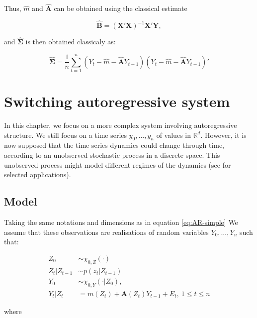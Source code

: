 \documentclass[]{book}
\begin{document}
Thus, \(\hat{m}\) and \(\hat{\mathbf{A}}\) can be obtained using the
classical estimate

\begin{equation}
\hat{\mathbf{B}} = \left(\mathbf{X'X}\right)^{-1}\mathbf{X}'\mathbf{Y}, \label{eq:AR-simple-B-hat}
\end{equation}

and \(\hat{\mathbf{\Sigma}}\) is then obtained classicaly as:

\begin{equation}
\hat{\mathbf{\Sigma}} = \frac{1}{n} \sum_{t = 1}^n \left(Y_t - \hat{m} - \hat{\mathbf{A}} Y_{t - 1}\right) \left(Y_t - \hat{m} - \hat{\mathbf{A}} Y_{t - 1}\right)' \label{eq:AR-simple-Sigma-hat}
\end{equation}

\chapter{Switching autoregressive
system}\label{switching-autoregressive-system}

In this chapter, we focus on a more complex system involving
autoregressive structure. We still focus on a time series
\(y_0, \dots, y_n\) of values in \(\mathbb{R}^d\). However, it is now
supposed that the time series dynamics could change through time,
according to an unobserved stochastic process in a discrete space. This
unobserved process might model different regimes of the dynamics (see
\citet{rabiner1989tutorial} for selected applications).

\section{Model}\label{model}

Taking the same notations and dimensions as in equation
\eqref{eq:AR-simple} We assume that these observations are realisations of
random variables \(Y_0,\dots, Y_n\) such that:

\begin{align*}
Z_0 &\sim \chi_{0, Z}(\cdot)\\
Z_t \vert Z_{t - 1} &\sim p(z_t \vert Z_{t - 1}) \\
Y_0 &\sim \chi_{0, Y}(\cdot \vert Z_0), \\
Y_t \vert Z_t &= m(Z_t) + \mathbf{A}(Z_t)Y_{t -1} + E_t,~1\leq t \leq n 
\end{align*}

where
\end{document}
